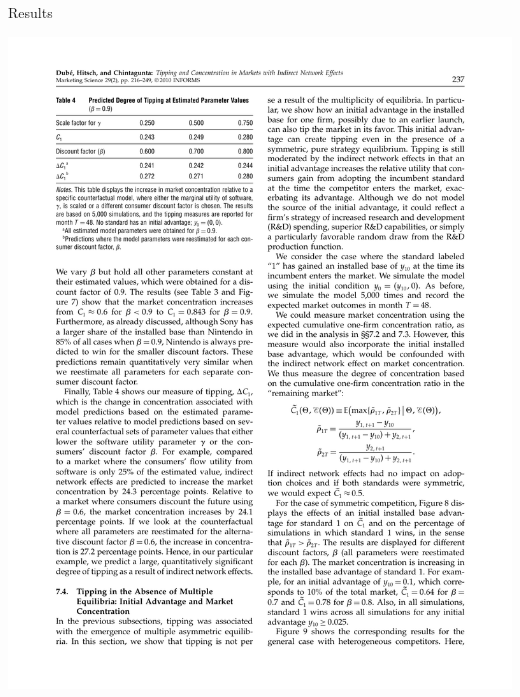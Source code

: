 \documentclass[xcolor=pdftex,dvipsnames,table,mathserif,aspectratio=169]{beamer}
\begin{document}
\begin{frame}{Results}
\begin{center}
\includegraphics[scale=0.65]{resources/dube-table4}\\
\end{center}
\end{frame}
\end{document}
